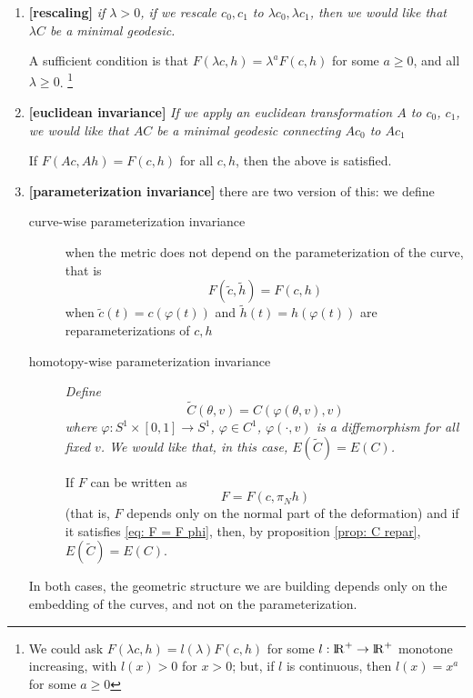 \documentclass[twoside,a4paper,english]{article}
\begin{document}
\begin{enumerate}
\item{\bf[rescaling]} \label{pro: rescaling}
  \emph{    if $\lambda>0$,
    if we rescale $c_0,c_1$ to $\lambda c_0,\lambda c_1$,
    then we would like that $\lambda C$ be a minimal geodesic.}
    
  A sufficient condition is that 
  $F(\lambda c,h)= \lambda^a F( c,h)$
  for some $a\ge 0$, and all $\lambda \ge 0$.
  \footnote{We could ask
  $F(\lambda c,h)= l(\lambda) F( c,h)$ 
  for some $l:{\protect\mathrm{l\hskip-0.15em R}}^+\to{\protect\mathrm{l\hskip-0.15em R}}^+$ monotone increasing,
  with $l(x)>0$ for $x>0$; but, 
  if $l$ is continuous, then $l(x)=x^a$ for some
  $a\ge 0$}


\item{\bf[euclidean invariance]}\label{pro: euclidean}
  \emph{ 
    If we apply an euclidean transformation $A$ to $c_0$, $c_1$,
    we would like that $AC$ be a minimal geodesic connecting $Ac_0$ to 
    $Ac_1$}

  If $F(A c,A  h)=F(c, h)$ for all $c,h$, then the above is satisfied.

\item{\bf[parameterization invariance]}\label{pro: invariant}
  there are two version of this: we define
  \begin{description}
  \item[curve-wise parameterization invariance]
    when the metric does not depend on the parameterization of the curve,
    that is
    \begin{equation}
      F(\tilde c, \tilde h)=F(c, h)
      \label{eq: F = F phi}
    \end{equation}
    when $\tilde c(t)=c(\varphi(t))$ and $\tilde h(t)=h(\varphi(t))$
    are reparameterizations of $c,h$
  \item[homotopy-wise parameterization invariance] 
    \emph{ Define $$\tilde C(\theta,v)= C( \varphi(\theta,v),v)$$
      where $\varphi:S^1\times[0,1] \to S^1$, $\varphi\in C^1$,
      $\varphi(\cdot,v)$ is a diffemorphism for all fixed $v$.  We
      would like that, in this case, $E(\tilde C)=E(C)$.}

    If $F$ can be written as
    \begin{equation}
      F=F(c,\pi_N h)\label{eq: F = F pi h}
    \end{equation}
    (that is, $F$ depends only on the normal part of the deformation)
    and if it satisfies \eqref{eq: F = F phi}, then, by proposition \ref{prop:
      C repar}, $E(\tilde C)=E(C)$.
  \end{description}
  In both cases, the geometric structure we are building depends
  only on the embedding of the curves, and not on the parameterization.
\label{lastprop}
\end{enumerate}
\end{document}
